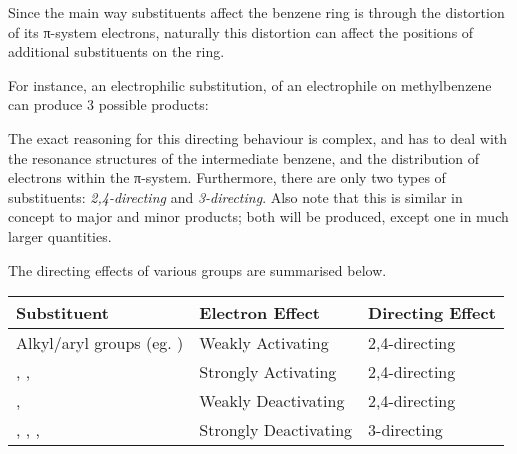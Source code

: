 			Since the main way substituents affect the benzene ring is through the distortion of its π-system electrons, naturally
			this distortion can affect the positions of additional substituents on the ring.

			For instance, an electrophilic substitution, of an electrophile  on methylbenzene can produce 3 possible products:


		The exact reasoning for this directing behaviour is complex, and has to deal with the resonance structures of the intermediate
		benzene, and the distribution of electrons within the π-system. Furthermore, there are only two types of substituents:
		\textit{2,4-directing} and \textit{3-directing}. Also note that this is similar in concept to major and minor products; both
		will be produced, except one in much larger quantities.

		The directing effects of various groups are summarised below.


		\begin{center}\begin{table}[htb]\renewcommand{\arraystretch}{1.5}
		\begin{tabu} to \textwidth {| X[-4,c,m] | X[c,m] | X[c,m] |}

			\hline
						Substituent						&	Electron Effect			&	Directing Effect	\\	\hline
			Alkyl/aryl groups (eg. )			&	Weakly Activating		&	2,4-directing		\\	\hline
			, , 				&	Strongly Activating		&	2,4-directing		\\	\hline
			\ch{-\chlorine}, 					&	Weakly Deactivating		&	2,4-directing		\\	\hline
			, , , 	&	Strongly Deactivating	&	3-directing			\\	\hline

		\end{tabu}
		\end{table}\end{center}


